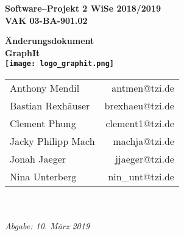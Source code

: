 \documentclass[enabledeprecatedfontcommands,fontsize=11pt,paper=a4,twoside]{scrartcl}
\begin{document}
  \thispagestyle{fancy}
  \fancyhead[LO,RE]{ }
  \fancyfoot[C]{}

  \vspace{3cm}

  \begin{minipage}[H]{\textwidth}
  \begin{center}
  \bf
  \Large
  Software--Projekt 2 WiSe 2018/2019\\
  \smallskip
  \small
  VAK 03-BA-901.02\\
  \vspace{3cm}
  \end{center}
  \end{minipage}
  \begin{minipage}[H]{\textwidth}
  \begin{center}
  \vspace{1cm}
  \bf
  \Large Änderungsdokument \\ 
  \vspace{1cm}
  \Huge\textbf{GraphIt}\normalsize \\
  \vspace{1cm}
  \texttt{[image: logo\_graphit.png]}	
  \vfill
  \end{center}
  \end{minipage}
  \vfill
  \begin{minipage}[H]{\textwidth}
  \begin{center}
  \sf
  \begin{tabular}{lr}
  Anthony Mendil & antmen@tzi.de \\
  Bastian Rexhäuser & brexhaeu@tzi.de\\
  Clement Phung & clement1@tzi.de \\
  Jacky Philipp Mach & machja@tzi.de \\
  Jonah Jaeger & jjaeger@tzi.de \\
  Nina Unterberg & nin\_unt@tzi.de \\
  \end{tabular}
  \\ ~
  \vspace{2cm}
  \\
  \it Abgabe: 10. März 2019\\ ~
  \end{center}
  \end{minipage}
\end{document}
